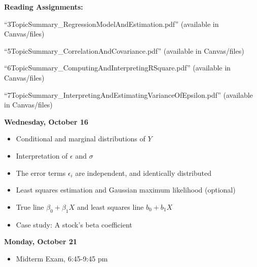 \documentclass[11pt]{article}
\begin{document}
\begin{itemize}
\end{itemize}
%
%


\noindent\textbf{Reading Assignments:}

 ``3TopicSummary\_RegressionModelAndEstimation.pdf'' (available in Canvas/files)
	
	``5TopicSummary\_CorrelationAndCovariance.pdf'' (available in Canvas/files)
	
	``6TopicSummary\_ComputingAndInterpretingRSquare.pdf'' (available in Canvas/files)
	
	``7TopicSummary\_InterpretingAndEstimatingVarianceOfEpsilon.pdf'' (available in Canvas/files)


\vspace{5mm}
\noindent\textbf{\large Wednesday, October 16} 	

\begin{itemize}

\item Conditional and marginal distributions of  $Y$
\item Interpretation of $\epsilon$ and $\sigma$
\item The error terms $\epsilon_i$  are independent, and identically distributed 
\item Least squares estimation and Gaussian maximum likelihood (optional)
\item True line $\beta_0+\beta_1X$ and least squares line $b_0+b_1 X$

\item Case study: A stock's beta coefficient

\end{itemize}


%
%

\vspace{5mm}
\noindent\textbf{\large Monday, October 21} 	


\begin{itemize}
\item Midterm Exam,  6:45-9:45 pm
\end{itemize}
\end{document}
